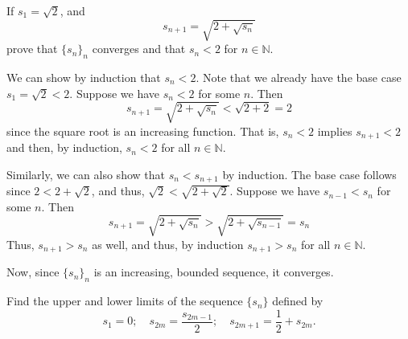 \documentclass[12 pt, letterpaper]{hmcpset}
\begin{document}
\pagebreak

\begin{problem}
	If $s_{1} = \sqrt{2}$, and
	\[
		s_{n + 1} = \sqrt{2 + \sqrt{s_{n}}}
	\]
	prove that $\{ s_{n} \}_{n}$ converges and that $s_{n} < 2$ for $n \in \mathbb{N}$.
\end{problem}

\begin{solution}
	We can show by induction that $s_{n} < 2$. Note that we already have the base case $s_{1} = \sqrt{2} < 2$. Suppose we have $s_{n} < 2$ for some $n$. Then
	\[
		s_{n + 1} = \sqrt{2 + \sqrt{s_{n}}} < \sqrt{2 + 2} = 2
	\]
	since the square root is an increasing function. That is, $s_{n} < 2$ implies $s_{n + 1} < 2$ and then, by induction, $s_{n} < 2$ for all $n \in \mathbb{N}$.

	Similarly, we can also show that $s_{n} < s_{n + 1}$ by induction. The base case follows since  $2 < 2 + \sqrt{2}$, and thus, $\sqrt{2} < \sqrt{2 + \sqrt{2}}$. Suppose we have $s_{n - 1} < s_{n}$ for some $n$. Then
	\[
		s_{n + 1} = \sqrt{2 + \sqrt{s_{n}}} > \sqrt{2 + \sqrt{s_{n - 1}}} = s_{n}
	\]
	Thus, $s_{n + 1} > s_{n}$ as well, and thus, by induction $s_{n + 1} > s_{n}$ for all $n \in \mathbb{N}$.

	Now, since $\{ s_{n} \}_{n}$ is an increasing, bounded sequence, it converges.
\end{solution}	

\pagebreak

\begin{problem}
	Find the upper and lower limits of the sequence $\{ s_{n} \}$ defined by
	\[
		s_{1} = 0; \quad s_{2m} = \frac{s_{2m - 1}}{2}; \quad s_{2m + 1} = \frac{1}{2} + s_{2m}.
	\]
\end{problem}
\end{document}
